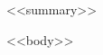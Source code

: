 \documentclass[10pt, a4paper]{cvClass}
\begin{document}
\makecvheader

\vspace{3mm}
{\fontsize{9pt}{11.5pt}\bodyfontlight\color{text}<<summary>>\par}

<<body>>
\end{document}
